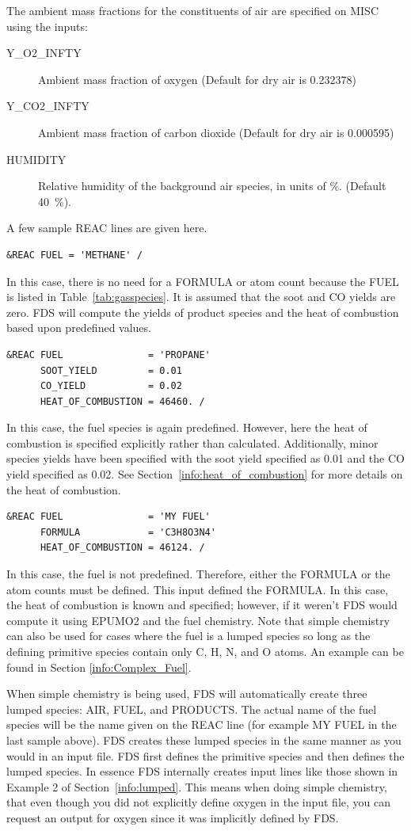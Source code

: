 \documentclass[11pt]{book}
\begin{document}
The ambient mass fractions for the constituents of air are specified on {\ct MISC} using the inputs:
\begin{description}
\item[{\ct Y\_O2\_INFTY}] Ambient mass fraction of oxygen (Default for dry air is 0.232378)
\item[{\ct Y\_CO2\_INFTY}] Ambient mass fraction of carbon dioxide (Default for dry air is 0.000595)
\item[{\ct HUMIDITY}] Relative humidity of the background air species, in units of \%. (Default 40~\%).
\end{description}
A few sample {\ct REAC} lines are given here.
\begin{lstlisting}
&REAC FUEL = 'METHANE' /
\end{lstlisting}
In this case, there is no need for a {\ct FORMULA} or atom count because the {\ct FUEL} is listed in Table~\ref{tab:gasspecies}. It is assumed that the soot and CO yields are zero.  FDS will compute the yields of product species and the heat of combustion based upon predefined values.
\begin{lstlisting}
&REAC FUEL               = 'PROPANE'
      SOOT_YIELD         = 0.01
      CO_YIELD           = 0.02
      HEAT_OF_COMBUSTION = 46460. /
\end{lstlisting}
In this case, the fuel species is again predefined.  However, here the heat of combustion is specified explicitly rather than calculated. Additionally, minor species yields have been specified with the soot yield specified as 0.01 and the CO yield specified as 0.02.
See Section~\ref{info:heat_of_combustion} for more details on the heat of combustion.
\begin{lstlisting}
&REAC FUEL               = 'MY FUEL'
      FORMULA            = 'C3H8O3N4'
      HEAT_OF_COMBUSTION = 46124. /
\end{lstlisting}
In this case, the fuel is not predefined.  Therefore, either the {\ct FORMULA} or the atom counts must be defined.  This input defined the {\ct FORMULA}. In this case, the heat of combustion is known and specified; however, if it weren't FDS would compute it using {\ct EPUMO2} and the fuel chemistry. Note that simple chemistry can also be used for cases where the fuel is a lumped species so long as the defining primitive species contain only C, H, N, and O atoms. An example can be found in Section \ref{info:Complex_Fuel}.

When simple chemistry is being used, FDS will automatically create three lumped species: {\ct AIR}, {\ct FUEL}, and {\ct PRODUCTS}.  The actual name of the fuel species will be the name given on the {\ct REAC} line (for example {\ct MY FUEL} in the last sample above). FDS creates these lumped species in the same manner as you would in an input file.  FDS first defines the primitive species and then defines the lumped species. In essence FDS internally creates input lines like those shown in Example 2 of Section~\ref{info:lumped}. This means when doing simple chemistry, that even though you did not explicitly define oxygen in the input file, you can request an output for oxygen since it was implicitly defined by FDS.
\end{document}

